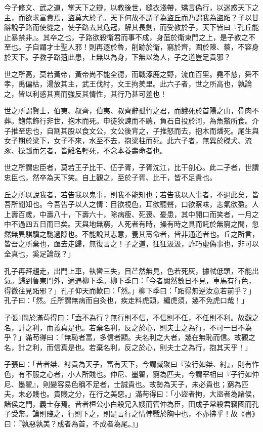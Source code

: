 \begin{pinyinscope}
今子修文、武之道，掌天下之辯，以教後世，縫衣淺帶，矯言偽行，以迷惑天下之主，而欲求富貴焉，盜莫大於子。天下何故不謂子為盜丘而乃謂我為盜跖？子以甘辭說子路而使從之，使子路去其危冠，解其長劍，而受教於子，天下皆曰『孔丘能止暴禁非』。其卒之也，子路欲殺衛君而事不成，身菹於衛東門之上，是子教之不至也。子自謂才士聖人邪！則再逐於魯，削跡於衛，窮於齊，圍於陳、蔡，不容身於天下。子教子路菹此患，上無以為身，下無以為人，子之道豈足貴邪？

世之所高，莫若黃帝，黃帝尚不能全德，而戰涿鹿之野，流血百里。堯不慈，舜不孝，禹偏枯，湯放其主，武王伐紂，文王拘羑里。此六子者，世之所高也，孰論之，皆以利惑其真而強反其情性，其行乃甚可羞也！

世之所謂賢士，伯夷、叔齊，伯夷、叔齊辭孤竹之君，而餓死於首陽之山，骨肉不葬。鮑焦飾行非世，抱木而死。申徒狄諫而不聽，負石自投於河，為魚鱉所食。介子推至忠也，自割其股以食文公，文公後背之，子推怒而去，抱木而燔死。尾生與女子期於梁下，女子不來，水至不去，抱梁柱而死。此六子者，無異於磔犬、流豕、操瓢而乞者，皆離名輕死，不念本養壽命者也。

世之所謂忠臣者，莫若王子比干、伍子胥，子胥沈江，比干剖心。此二子者，世謂忠臣也，然卒為天下笑。自上觀之，至於子胥、比干，皆不足貴也。

丘之所以說我者，若告我以鬼事，則我不能知也；若告我以人事者，不過此矣，皆吾所聞知也。今吾告子以人之情：目欲視色，耳欲聽聲，口欲察味，志氣欲盈。人上壽百歲，中壽八十，下壽六十，除病瘦、死喪、憂患，其中開口而笑者，一月之中不過四五日而已矣。天與地無窮，人死者有時，操有時之具而託於無窮之間，忽然無異騏驥之馳過隙也。不能說其志意，養其壽命者，皆非通道者也。丘之所言，皆吾之所棄也，亟去走歸，無復言之！子之道，狂狂汲汲，詐巧虛偽事也，非可以全真也，奚足論哉？」

孔子再拜趨走，出門上車，執轡三失，目芒然無見，色若死灰，據軾低頭，不能出氣。歸到魯東門外，適遇柳下季。柳下季曰：「今者闕然數日不見，車馬有行色，得微往見跖邪？」孔子仰天而歎曰：「然。」柳下季曰：「跖得無逆汝意若前乎？」孔子曰：「然。丘所謂無病而自灸也，疾走料虎頭，編虎須，幾不免虎口哉！」

子張1問於滿苟得曰：「盍不為行？無行則不信，不信則不任，不任則不利。故觀之名，計之利，而義真是也。若棄名利，反之於心，則夫士之為行，不可一日不為乎？」滿苟得曰：「無恥者富，多信者顯。夫名利之大者，幾在無恥而信。故觀之名，計之利，而信真是也。若棄名利，反之於心，則夫士之為行，抱其天乎！」

子張曰：「昔者桀、紂貴為天子，富有天下，今謂臧聚曰『汝行如桀、紂』，則有怍色，有不服之心者，小人所賤也。仲尼、墨翟，窮為匹夫，今謂宰相曰『子行如仲尼、墨翟』，則變容易色稱不足者，士誠貴也。故勢為天子，未必貴也；窮為匹夫，未必賤也。貴賤之分，在行之美惡。」滿苟得曰：「小盜者拘，大盜者為諸侯，諸侯之門，義士存焉。昔者桓公小白殺兄入嫂而管仲為臣，田成子常殺君竊國而孔子受幣。論則賤之，行則下之，則是言行之情悖戰於胸中也，不亦拂乎！故《書》曰：『孰惡孰美？成者為首，不成者為尾。』」


\end{pinyinscope}
